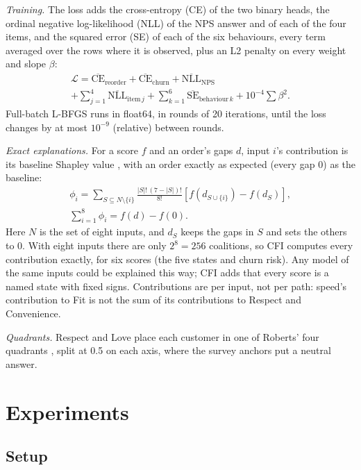 \documentclass[10pt,twocolumn,letterpaper]{article}
\newcommand{\runin}[1]{\textit{#1}\hspace{0.4em}}
\begin{document}
\runin{Training.} The loss adds the cross-entropy (CE) of the two binary heads, the ordinal negative log-likelihood (NLL) of the NPS answer and of each of the four items, and the squared error (SE) of each of the six behaviours, every term averaged over the rows where it is observed, plus an L2 penalty on every weight and slope $\beta$:
\begin{multline}
\mathcal{L} = \overline{\mathrm{CE}}_{\mathrm{reorder}} + \overline{\mathrm{CE}}_{\mathrm{churn}} + \overline{\mathrm{NLL}}_{\mathrm{NPS}} \\
+ \sum_{j=1}^{4} \overline{\mathrm{NLL}}_{\mathrm{item}\,j} + \sum_{k=1}^{6} \overline{\mathrm{SE}}_{\mathrm{behaviour}\,k} + 10^{-4} \sum \beta^2.
\end{multline}
Full-batch L-BFGS runs in float64, in rounds of 20 iterations, until the loss changes by at most $10^{-9}$ (relative) between rounds.

\runin{Exact explanations.} For a score $f$ and an order's gaps $d$, input $i$'s contribution is its baseline Shapley value \cite{sundararajan2020}, with an order exactly as expected (every gap 0) as the baseline:
\begin{gather}
\phi_i = \sum_{S \subseteq N \setminus \{i\}} \frac{|S|!\,(7-|S|)!}{8!} \left[ f(d_{S \cup \{i\}}) - f(d_S) \right], \\
\sum_{i=1}^{8} \phi_i = f(d) - f(0).
\end{gather}
Here $N$ is the set of eight inputs, and $d_S$ keeps the gaps in $S$ and sets the others to 0. With eight inputs there are only $2^8 = 256$ coalitions, so CFI computes every contribution exactly, for six scores (the five states and churn risk). Any model of the same inputs could be explained this way; CFI adds that every score is a named state with fixed signs. Contributions are per input, not per path: speed's contribution to Fit is not the sum of its contributions to Respect and Convenience.

\runin{Quadrants.} Respect and Love place each customer in one of Roberts' four quadrants \cite{roberts2004}, split at 0.5 on each axis, where the survey anchors put a neutral answer.

\section{Experiments}\label{sec:experiments}

\subsection{Setup}
\end{document}
